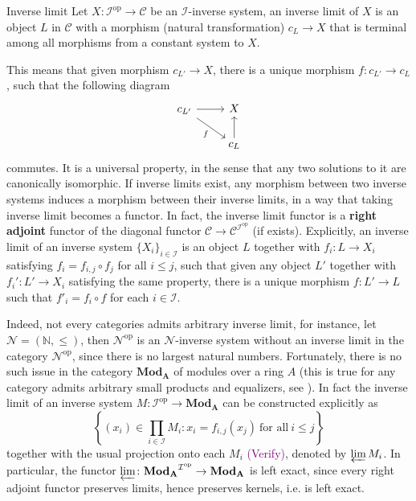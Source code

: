 \documentclass[10pt]{extarticle}
\begin{document}
\begin{definition}{Inverse limit}{}
    Let $X\colon \mathcal{I}^\text{op}\to\mathcal{C}$ be an $\mathcal{I}$-inverse system, an inverse limit of $X$ is an object $L$ in $\mathcal{C}$ with a morphism (natural transformation) $c_L\to X$ that is terminal among all morphisms from a constant system to $X$. 
\end{definition}

This means that given morphism $c_{L'}\to X$, there is a unique morphism $f\colon c_{L'}\to c_L$, such that the following diagram
\[\begin{tikzcd}
	{c_{L'}} & X \\
	& {c_L}
	\arrow[from=1-1, to=1-2]
	\arrow["f"', from=1-1, to=2-2]
	\arrow[from=2-2, to=1-2]
\end{tikzcd}\]
commutes. It is a universal property, in the sense that any two solutions to it are canonically isomorphic. If inverse limits exist, any morphism between two inverse systems induces a morphism between their inverse limits, in a way that taking inverse limit becomes a functor. In fact, the inverse limit functor is a \textbf{right adjoint} functor of the diagonal functor $\mathcal{C}\to \mathcal{C}^{\mathcal{I}^\text{op}}$ (if exists). Explicitly, an inverse limit of an inverse system $\{X_i\}_{i\in\mathcal{I}}$ is an object $L$ together with $f_i\colon L\to X_i$ satisfying $f_i=f_{i,j}\circ f_j$ for all $i\leq j$, such that given any object $L'$ together with $f_i'\colon L'\to X_i$ satisfying the same property, there is a unique morphism $f\colon L'\to L$ such that $f'_i=f_i\circ f$ for each $i\in\mathcal{I}$.

Indeed, not every categories admits arbitrary inverse limit, for instance, let $\mathcal{N}=(\mathbb{N},\leq)$, then $\mathcal{N}^\text{op}$ is an $\mathcal{N}$-inverse system without an inverse limit in the category $\mathcal{N}^\text{op}$, since there is no largest natural numbers. Fortunately, there is no such issue in the category $\mathbf{Mod_A}$ of modules over a ring $A$ (this is true for any category admits arbitrary small products and equalizers, see \cite[Proposition.~8.6.6]{bergman2015invitation}). In fact the inverse limit of an inverse system $M\colon\mathcal{I}^\text{op}\to\mathbf{Mod_A}$ can be constructed explicitly as
\[
\left\{(x_i)\in\prod_{i\in\mathcal{I}}M_i\colon x_i=f_{i,j}(x_j)\ \text{for all}\ i\leq j\right\}
\]
together with the usual projection onto each $M_i$ \textcolor{purple}{(Verify)}, denoted by $\varprojlim M_i$. In particular, the functor $\varprojlim\colon \mathbf{Mod_A}^{\mathcal{{I}^\text{op}}}\to \mathbf{Mod_A}$ is left exact, since every right adjoint functor preserves limits, hence preserves kernels, i.e. is left exact.
\end{document}
